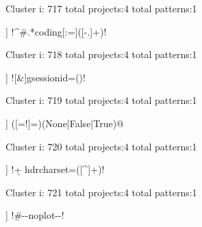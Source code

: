 Cluster i: 717
total projects:4
total patterns:1
\begin{multicols}{1}
\begin{description}[noitemsep,topsep=0pt]
\item [[4] ] \cverb!^#.*coding[:=]\s*([-\w.]+)!
\end{description}
\end{multicols}







Cluster i: 718
total projects:4
total patterns:1
\begin{multicols}{1}
\begin{description}[noitemsep,topsep=0pt]
\item [[4] ] \cverb![\?\&]gsessionid=(\w*\-)!
\end{description}
\end{multicols}







Cluster i: 719
total projects:4
total patterns:1
\begin{multicols}{1}
\begin{description}[noitemsep,topsep=0pt]
\item [[4] ] \cverb@([=!]=)\s*(None|False|True)@
\end{description}
\end{multicols}







Cluster i: 720
total projects:4
total patterns:1
\begin{multicols}{1}
\begin{description}[noitemsep,topsep=0pt]
\item [[4] ] \cverb!\d+ hdrcharset=([^\n]+)\n!
\end{description}
\end{multicols}







Cluster i: 721
total projects:4
total patterns:1
\begin{multicols}{1}
\begin{description}[noitemsep,topsep=0pt]
\item [[4] ] \cverb!#\s*-\*-\s*noplot\s*-\*-!
\end{description}
\end{multicols}







